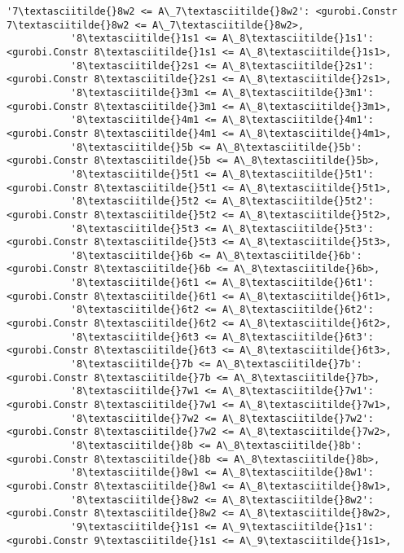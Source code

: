 \documentclass[11pt]{article}
\begin{document}
\begin{Verbatim}[commandchars=\\\{\}]
           '7\textasciitilde{}8w2 <= A\_7\textasciitilde{}8w2': <gurobi.Constr 7\textasciitilde{}8w2 <= A\_7\textasciitilde{}8w2>,
           '8\textasciitilde{}1s1 <= A\_8\textasciitilde{}1s1': <gurobi.Constr 8\textasciitilde{}1s1 <= A\_8\textasciitilde{}1s1>,
           '8\textasciitilde{}2s1 <= A\_8\textasciitilde{}2s1': <gurobi.Constr 8\textasciitilde{}2s1 <= A\_8\textasciitilde{}2s1>,
           '8\textasciitilde{}3m1 <= A\_8\textasciitilde{}3m1': <gurobi.Constr 8\textasciitilde{}3m1 <= A\_8\textasciitilde{}3m1>,
           '8\textasciitilde{}4m1 <= A\_8\textasciitilde{}4m1': <gurobi.Constr 8\textasciitilde{}4m1 <= A\_8\textasciitilde{}4m1>,
           '8\textasciitilde{}5b <= A\_8\textasciitilde{}5b': <gurobi.Constr 8\textasciitilde{}5b <= A\_8\textasciitilde{}5b>,
           '8\textasciitilde{}5t1 <= A\_8\textasciitilde{}5t1': <gurobi.Constr 8\textasciitilde{}5t1 <= A\_8\textasciitilde{}5t1>,
           '8\textasciitilde{}5t2 <= A\_8\textasciitilde{}5t2': <gurobi.Constr 8\textasciitilde{}5t2 <= A\_8\textasciitilde{}5t2>,
           '8\textasciitilde{}5t3 <= A\_8\textasciitilde{}5t3': <gurobi.Constr 8\textasciitilde{}5t3 <= A\_8\textasciitilde{}5t3>,
           '8\textasciitilde{}6b <= A\_8\textasciitilde{}6b': <gurobi.Constr 8\textasciitilde{}6b <= A\_8\textasciitilde{}6b>,
           '8\textasciitilde{}6t1 <= A\_8\textasciitilde{}6t1': <gurobi.Constr 8\textasciitilde{}6t1 <= A\_8\textasciitilde{}6t1>,
           '8\textasciitilde{}6t2 <= A\_8\textasciitilde{}6t2': <gurobi.Constr 8\textasciitilde{}6t2 <= A\_8\textasciitilde{}6t2>,
           '8\textasciitilde{}6t3 <= A\_8\textasciitilde{}6t3': <gurobi.Constr 8\textasciitilde{}6t3 <= A\_8\textasciitilde{}6t3>,
           '8\textasciitilde{}7b <= A\_8\textasciitilde{}7b': <gurobi.Constr 8\textasciitilde{}7b <= A\_8\textasciitilde{}7b>,
           '8\textasciitilde{}7w1 <= A\_8\textasciitilde{}7w1': <gurobi.Constr 8\textasciitilde{}7w1 <= A\_8\textasciitilde{}7w1>,
           '8\textasciitilde{}7w2 <= A\_8\textasciitilde{}7w2': <gurobi.Constr 8\textasciitilde{}7w2 <= A\_8\textasciitilde{}7w2>,
           '8\textasciitilde{}8b <= A\_8\textasciitilde{}8b': <gurobi.Constr 8\textasciitilde{}8b <= A\_8\textasciitilde{}8b>,
           '8\textasciitilde{}8w1 <= A\_8\textasciitilde{}8w1': <gurobi.Constr 8\textasciitilde{}8w1 <= A\_8\textasciitilde{}8w1>,
           '8\textasciitilde{}8w2 <= A\_8\textasciitilde{}8w2': <gurobi.Constr 8\textasciitilde{}8w2 <= A\_8\textasciitilde{}8w2>,
           '9\textasciitilde{}1s1 <= A\_9\textasciitilde{}1s1': <gurobi.Constr 9\textasciitilde{}1s1 <= A\_9\textasciitilde{}1s1>,

\end{Verbatim}
\end{document}
